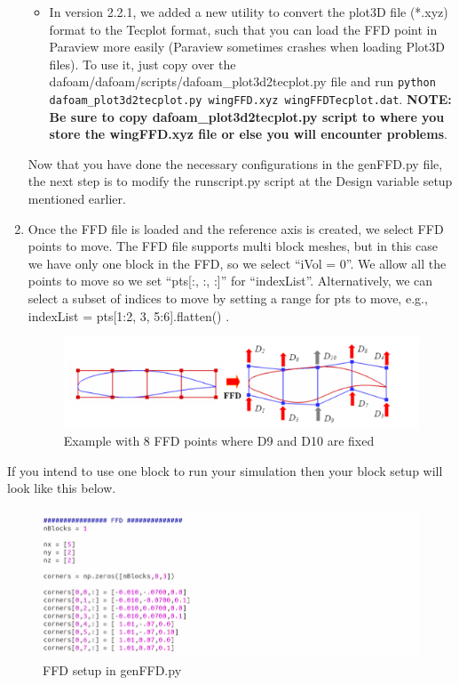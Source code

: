 \documentclass[12pt]{article}
\begin{document}
\begin{enumerate}
\begin{itemize}
        \item In version 2.2.1, we added a new utility to convert the plot3D file (*.xyz) format to the Tecplot format, such that you can load the FFD point in Paraview more easily (Paraview sometimes crashes when loading Plot3D files). To use it, just copy over the dafoam/dafoam/scripts/dafoam\_plot3d2tecplot.py file and run \texttt{python dafoam\_plot3d2tecplot.py wingFFD.xyz wingFFDTecplot.dat}. \textbf{NOTE: Be sure to copy dafoam\_plot3d2tecplot.py script to where you store the wingFFD.xyz file or else you will encounter problems}.

    \end{itemize}
    
    Now that you have done the necessary configurations in the genFFD.py file, the next step is to modify the runscript.py script at the Design variable setup mentioned earlier. 
    
    \item Once the FFD file is loaded and the reference axis is created, we select FFD points to move. The FFD file supports multi block meshes, but in this case we have only one block in the FFD, so we select “iVol = 0”. We allow all the points to move so we set “pts[:, :, :]” for “indexList”. Alternatively, we can select a subset of indices to move by setting a range for pts to move, e.g., indexList = pts[1:2, 3, 5:6].flatten() \cite{DAFoam}.
    
    
    \begin{figure}[ht]
    \centering
    \includegraphics[width= 0.85 \textwidth]{FFDairfoil.PNG}
    \caption{Example with 8 FFD points where D9 and D10 are fixed \cite{Ronzheimer2004}}
    \label{fig:my_label}
\end{figure}
    
  \end{enumerate}  
  
\noindent If you intend to use one block to run your simulation then your block setup will look like this below.\vspace{4mm} 
    
    \begin{figure}[ht]
    \centering
    \includegraphics[width= 1 \textwidth]{FFDPY.PNG}
    \caption{FFD setup in genFFD.py}
    \label{fig:my_label}
\end{figure}
\end{document}
